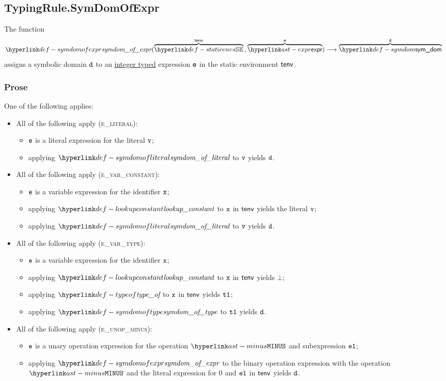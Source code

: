\subsection{TypingRule.SymDomOfExpr \label{sec:TypingRule.SymDomOfExpr}}
\hypertarget{def-symdomofexpr}{}
The function
\[
\symdomofexpr(
  \overname{\staticenvs}{\tenv} \aslsep
  \overname{\expr}{\ve}
) \aslto
\overname{\symdom}{\vd}
\]
assigns a symbolic domain $\texttt{d}$ to an \underline{integer typed} expression $\texttt{e}$ in the static environment $\textsf{tenv}$.

\subsubsection{Prose}
One of the following applies:
\begin{itemize}
  \item All of the following apply (\textsc{e\_literal}):
  \begin{itemize}
    \item $\texttt{e}$ is a literal expression for the literal $\texttt{v}$;
    \item applying $\symdomofliteral$ to $\texttt{v}$ yields $\texttt{d}$.
  \end{itemize}

  \item All of the following apply (\textsc{e\_var\_constant}):
  \begin{itemize}
    \item $\texttt{e}$ is a variable expression for the identifier $\texttt{x}$;
    \item applying $\lookupconstant$ to $\texttt{x}$ in $\textsf{tenv}$ yields the literal $\texttt{v}$;
    \item applying $\symdomofliteral$ to $\texttt{v}$ yields $\texttt{d}$.
  \end{itemize}

  \item All of the following apply (\textsc{e\_var\_type}):
  \begin{itemize}
    \item $\texttt{e}$ is a variable expression for the identifier $\texttt{x}$;
    \item applying $\lookupconstant$ to $\texttt{x}$ in $\textsf{tenv}$ yields $\bot$;
    \item applying $\typeof$ to $\texttt{x}$ in $\textsf{tenv}$ yields $\texttt{t1}$;
    \item applying $\symdomoftype$ to $\texttt{t1}$ yields $\texttt{d}$.
  \end{itemize}

  \item All of the following apply (\textsc{e\_unop\_minus}):
  \begin{itemize}
    \item $\texttt{e}$ is a unary operation expression for the operation $\MINUS$ and subexpression $\texttt{e1}$;
    \item applying $\symdomofexpr$ to the binary operation expression with the operation $\MINUS$
          and the literal expression for $0$ and $\texttt{e1}$ in $\textsf{tenv}$ yields $\texttt{d}$.
  \end{itemize}


\end{itemize}
